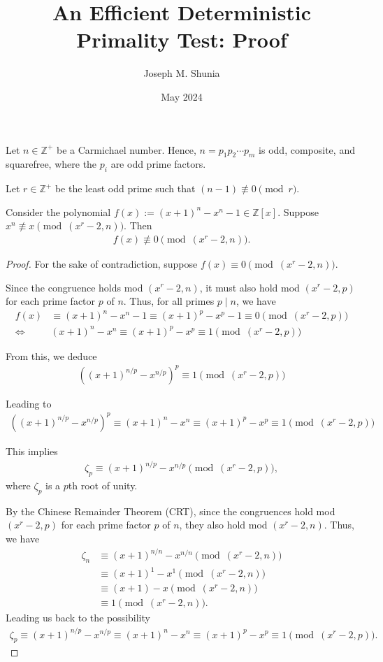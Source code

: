 \title{An Efficient Deterministic Primality Test: Proof}
\author{Joseph M. Shunia}
\date{May 2024}

\begin{theorem}
Let $n \in \mathbb{Z}^+$ be a Carmichael number. Hence, $n = p_1 p_2 \cdots p_m$ is odd, composite, and squarefree, where the $p_i$ are odd prime factors.

Let $r \in \mathbb{Z}^+$ be the least odd prime such that $(n-1) \not\equiv 0 \pmod{r}$.

Consider the polynomial $f(x) := (x+1)^n - x^n - 1 \in \mathbb{Z}[x]$. Suppose $x^n \not\equiv x \pmod{(x^r-2,n)}$. Then
\begin{align*}
f(x) \not\equiv 0 \pmod{(x^r-2, n)}.
\end{align*}
\end{theorem}
\begin{proof}
For the sake of contradiction, suppose $f(x) \equiv 0 \pmod{(x^r-2, n)}$.

Since the congruence holds mod $(x^r-2, n)$, it must also hold mod $(x^r-2, p)$ for each prime factor $p$ of $n$. Thus, for all primes $p \mid n$, we have
\begin{align*}
f(x) &\equiv (x+1)^n - x^n - 1 \equiv (x+1)^p - x^p - 1 \equiv 0 \pmod{(x^r-2, p)} \\
\Longleftrightarrow & (x+1)^n - x^n \equiv (x+1)^p - x^p \equiv 1 \pmod{(x^r-2, p)}
\end{align*}

From this, we deduce
\begin{align*}
\left( (x+1)^{n/p} - x^{n/p} \right)^p \equiv 1 \pmod{(x^r-2, p)}
\end{align*}

Leading to
\begin{align*}
\left( (x+1)^{n/p} - x^{n/p} \right)^p \equiv (x+1)^n - x^n \equiv (x+1)^p - x^p \equiv 1 \pmod{(x^r-2, p)}
\end{align*}

This implies
\begin{align*}
    \zeta_p \equiv (x+1)^{n/p} - x^{n/p} \pmod{(x^r-2, p)} ,
\end{align*}
where $\zeta_p$ is a $p$th root of unity.

By the Chinese Remainder Theorem (CRT), since the congruences hold mod $(x^r-2, p)$ for each prime factor $p$ of $n$, they also hold mod $(x^r-2, n)$. Thus, we have
\begin{align*}
\zeta_n &\equiv (x+1)^{n/n} - x^{n/n} \pmod{(x^r-2, n)} \\
&\equiv (x+1)^1 - x^1 \pmod{(x^r-2, n)} \\
&\equiv (x+1) - x \pmod{(x^r-2, n)} \\
&\equiv 1 \pmod{(x^r-2, n)} .
\end{align*}
Leading us back to the possibility
\begin{align*}
\zeta_p \equiv (x+1)^{n/p} - x^{n/p} \equiv (x+1)^n - x^n \equiv (x+1)^p - x^p \equiv 1 \pmod{(x^r-2, p)} .
\end{align*}


\end{proof}
